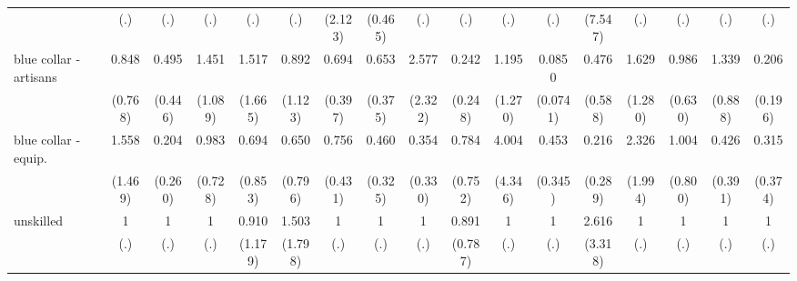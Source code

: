 {\begin{tabular}{l*{16}{c}}
                    &         (.)         &         (.)         &         (.)         &         (.)         &         (.)         &     (2.123)         &     (0.465)         &         (.)         &         (.)         &         (.)         &         (.)         &     (7.547)         &         (.)         &         (.)         &         (.)         &         (.)         \\
[1em]
blue collar - artisans&       0.848         &       0.495         &       1.451         &       1.517         &       0.892         &       0.694         &       0.653         &       2.577         &       0.242         &       1.195         &      0.0850\sym{**} &       0.476         &       1.629         &       0.986         &       1.339         &       0.206         \\
                    &     (0.768)         &     (0.446)         &     (1.089)         &     (1.665)         &     (1.123)         &     (0.397)         &     (0.375)         &     (2.322)         &     (0.248)         &     (1.270)         &    (0.0741)         &     (0.588)         &     (1.280)         &     (0.630)         &     (0.888)         &     (0.196)         \\
[1em]
blue collar - equip.&       1.558         &       0.204         &       0.983         &       0.694         &       0.650         &       0.756         &       0.460         &       0.354         &       0.784         &       4.004         &       0.453         &       0.216         &       2.326         &       1.004         &       0.426         &       0.315         \\
                    &     (1.469)         &     (0.260)         &     (0.728)         &     (0.853)         &     (0.796)         &     (0.431)         &     (0.325)         &     (0.330)         &     (0.752)         &     (4.346)         &     (0.345)         &     (0.289)         &     (1.994)         &     (0.800)         &     (0.391)         &     (0.374)         \\
[1em]
unskilled           &           1         &           1         &           1         &       0.910         &       1.503         &           1         &           1         &           1         &       0.891         &           1         &           1         &       2.616         &           1         &           1         &           1         &           1         \\
                    &         (.)         &         (.)         &         (.)         &     (1.179)         &     (1.798)         &         (.)         &         (.)         &         (.)         &     (0.787)         &         (.)         &         (.)         &     (3.318)         &         (.)         &         (.)         &         (.)         &         (.)         \\

\end{tabular}}
